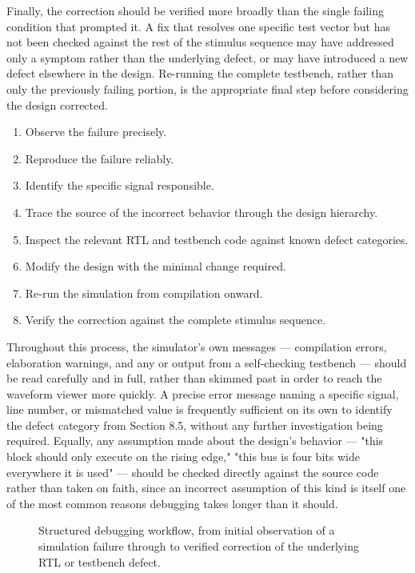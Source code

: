 Finally, the correction should be verified more broadly than the single failing condition that prompted it. A fix that resolves one specific test vector but has not been checked against the rest of the stimulus sequence may have addressed only a symptom rather than the underlying defect, or may have introduced a new defect elsewhere in the design. Re-running the complete testbench, rather than only the previously failing portion, is the appropriate final step before considering the design corrected.

\begin{enumerate}
    \item Observe the failure precisely.
    \item Reproduce the failure reliably.
    \item Identify the specific signal responsible.
    \item Trace the source of the incorrect behavior through the design hierarchy.
    \item Inspect the relevant RTL and testbench code against known defect categories.
    \item Modify the design with the minimal change required.
    \item Re-run the simulation from compilation onward.
    \item Verify the correction against the complete stimulus sequence.
\end{enumerate}

Throughout this process, the simulator's own messages --- compilation errors, elaboration warnings, and any  or  output from a self-checking testbench --- should be read carefully and in full, rather than skimmed past in order to reach the waveform viewer more quickly. A precise error message naming a specific signal, line number, or mismatched value is frequently sufficient on its own to identify the defect category from Section 8.5, without any further investigation being required. Equally, any assumption made about the design's behavior --- "this block should only execute on the rising edge," "this bus is four bits wide everywhere it is used" --- should be checked directly against the source code rather than taken on faith, since an incorrect assumption of this kind is itself one of the most common reasons debugging takes longer than it should.


\begin{figure}[h]
\centering
\caption{Structured debugging workflow, from initial observation of a simulation failure through to verified correction of the underlying RTL or testbench defect.}
\label{fig:debugging_workflow}
\end{figure}


